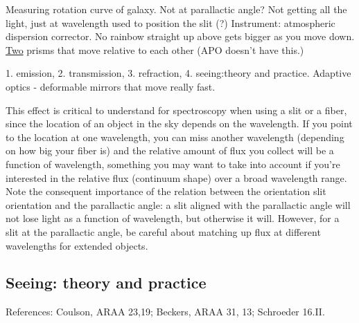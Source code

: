 \documentclass[12pt]{article}
\begin{document}
\textcolor{myBlue}{Measuring rotation curve of galaxy. Not at parallactic
angle? Not getting all the light, just at wavelength used to
position the slit (?)
Instrument: atmospheric dispersion corrector.
No rainbow straight up above gets bigger as you move down.
\underline{Two} prisms that move relative to each other
(APO doesn't have this.)}

\textcolor{myBlue}{1. emission, 2. transmission, 3. refraction,
4. seeing:theory and practice. Adaptive optics - deformable mirrors
that move really fast}.

This effect is critical to understand for spectroscopy when using a
slit or a fiber, since the location of an object in the sky depends on
the wavelength. If you point to the location at one wavelength, you
can miss another wavelength
\textcolor{myBlue}{(depending on how big your fiber is)}
and the relative amount of flux you
collect will be a function of wavelength, something you may want to
take into account if you're interested in the relative flux (continuum
shape) over a broad wavelength range. Note the consequent importance
of the relation between the orientation slit orientation and the
parallactic angle: a slit aligned with the parallactic angle will not
lose light as a function of wavelength, but otherwise it will.
However, for a slit at the parallactic angle, be careful about
matching up flux at different wavelengths for extended objects.
\subsection*{Seeing: theory and practice}
References: Coulson, ARAA 23,19; Beckers, ARAA 31, 13; Schroeder
16.II.
\end{document}
